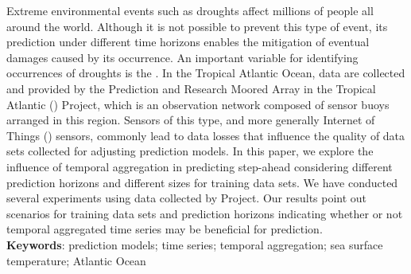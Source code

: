 \documentclass[12pt]{report} %
\begin{document}
	\justifying
	\noindent
	Extreme environmental events such as droughts affect millions of people all around the world. Although it is not possible to prevent this type of event, its prediction under different time horizons enables the mitigation of eventual damages caused by its occurrence. An important variable for identifying occurrences of droughts is the . In the Tropical Atlantic Ocean,  data are collected and provided by the Prediction and Research Moored Array in the Tropical Atlantic () Project, which is an observation network composed of sensor buoys arranged in this region. Sensors of this type, and more generally Internet of Things () sensors, commonly lead to data losses that influence the quality of data sets collected for adjusting prediction models. In this paper, we explore the influence of temporal aggregation in predicting step-ahead  considering different prediction horizons and different sizes for training data sets. We have conducted several experiments using data collected by  Project. Our results point out scenarios for training data sets and prediction horizons indicating whether or not temporal aggregated  time series may be beneficial for prediction.
	\\[3em]
	
	\normalsize\noindent
	\textbf{Keywords}: prediction models; time series; temporal aggregation; sea surface temperature; Atlantic Ocean
	
	
	\pagebreak
	
	
	\renewcommand{\cftdot}{}
	\tableofcontents %
	
	\pagebreak
	
	
	\listoffigures
	
	\pagebreak
	
	
\end{document}
